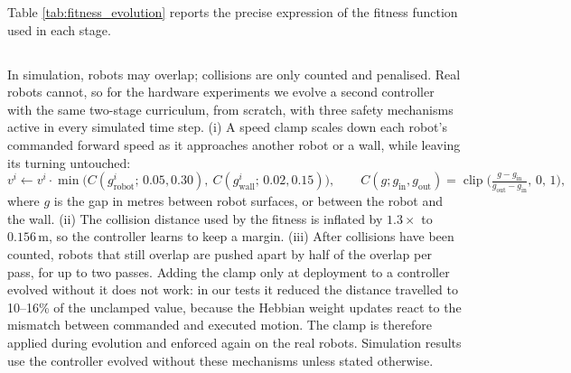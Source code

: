  Table \ref{tab:fitness_evolution} reports the precise expression of the fitness function used in each stage.

\subsection{\texorpdfstring{}{Safety Mechanisms for Hardware Transfer}}
\label{sec:safety}
\begingroup\color{red}In simulation, robots may overlap; collisions are only counted and penalised. Real robots cannot, so for the hardware experiments we evolve a second controller with the same two-stage curriculum, from scratch, with three safety mechanisms active in every simulated time step. (i) A speed clamp scales down each robot's commanded forward speed as it approaches another robot or a wall, while leaving its turning untouched:
\begin{equation}
v^i \leftarrow v^i \cdot \min\!\big(C(g^i_{\text{robot}};\,0.05, 0.30),\ C(g^i_{\text{wall}};\,0.02, 0.15)\big),
\qquad
C(g; g_{\text{in}}, g_{\text{out}}) = \operatorname{clip}\!\Big(\tfrac{g - g_{\text{in}}}{g_{\text{out}} - g_{\text{in}}},\,0,\,1\Big),
\label{eq:clamp}
\end{equation}
where $g$ is the gap in metres between robot surfaces, or between the robot and the wall. (ii) The collision distance used by the fitness is inflated by $1.3\times$ to $0.156$\,m, so the controller learns to keep a margin. (iii) After collisions have been counted, robots that still overlap are pushed apart by half of the overlap per pass, for up to two passes. Adding the clamp only at deployment to a controller evolved without it does not work: in our tests it reduced the distance travelled to 10--16\% of the unclamped value, because the Hebbian weight updates react to the mismatch between commanded and executed motion. The clamp is therefore applied during evolution and enforced again on the real robots. Simulation results use the controller evolved without these mechanisms unless stated otherwise.\endgroup


